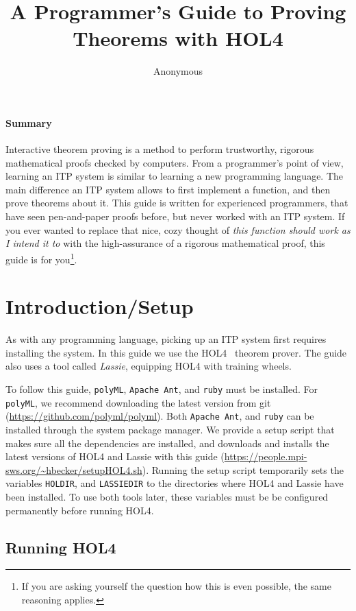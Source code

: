 \documentclass[10pt]{scrartcl}
\title{A Programmer's Guide to Proving Theorems with HOL4}
\author{Anonymous}
\date{}
\begin{document}
\maketitle{}

\paragraph*{Summary}
Interactive theorem proving is a method to perform trustworthy, rigorous
mathematical proofs checked by computers.
From a programmer's point of view, learning an ITP system is similar to
learning a new programming language.
The main difference an ITP system allows to first implement a function,
and then prove theorems about it.
This guide is written for experienced programmers, that have seen pen-and-paper
proofs before, but never worked with an ITP system.
If you ever wanted to replace that nice, cozy thought of \emph{this function
should work as I intend it to} with the high-assurance of a rigorous
mathematical proof, this guide is for you\footnote{If you are asking yourself the question how this is even possible, the same reasoning applies.}.

\section{Introduction/Setup}
%
As with any programming language, picking up an ITP system first requires
installing the system.
In this guide we use the HOL4~\cite{HOL4web} theorem prover.
The guide also uses a tool called \emph{Lassie}, equipping HOL4 with training
wheels.

To follow this guide, \texttt{polyML}, \texttt{Apache Ant}, and \texttt{ruby}
must be installed.
For \texttt{polyML}, we recommend downloading the latest version from git
(\url{https://github.com/polyml/polyml}).
Both \texttt{Apache Ant}, and \texttt{ruby} can be installed through the system
package manager.
We provide a setup script that makes sure all the dependencies are installed,
and downloads and installs the latest versions of HOL4 and Lassie with this
guide (\url{https://people.mpi-sws.org/~hbecker/setupHOL4.sh}).
Running the setup script temporarily sets the variables \texttt{HOLDIR}, and
\texttt{LASSIEDIR} to the directories where HOL4 and Lassie have been installed.
To use both tools later, these variables must be be configured permanently
before running HOL4.

\subsection{Running HOL4}
\end{document}
